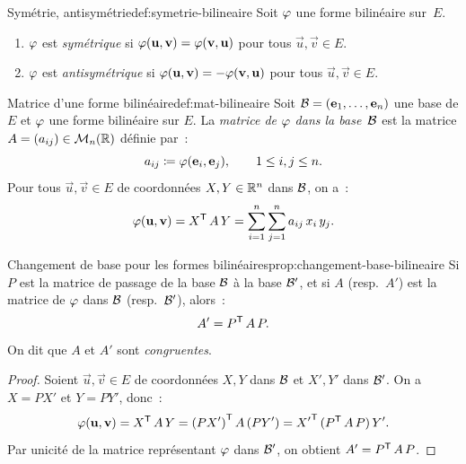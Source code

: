 \begin{definition}{Symétrie, antisymétrie}{def:symetrie-bilineaire}
  Soit $\varphi$ une forme bilinéaire sur~$E$.
  \begin{enumerate}[label=(\roman*)]
    \item $\varphi$ est \emph{symétrique} si
      $\varphi(\mathbf{u},\mathbf{v})=\varphi(\mathbf{v},\mathbf{u})$ pour tous
      $\vec{u},\vec{v}\in E$.
    \item $\varphi$ est \emph{antisymétrique} si
      $\varphi(\mathbf{u},\mathbf{v})=-\varphi(\mathbf{v},\mathbf{u})$ pour tous
      $\vec{u},\vec{v}\in E$.
  \end{enumerate}
\end{definition}

\begin{definition}{Matrice d'une forme bilinéaire}{def:mat-bilineaire}
  Soit ${\mathcal{B}}=(\mathbf{e}_{1},\ldots,\mathbf{e}_{n})$ une base de $E$ et $\varphi$ une
  forme bilinéaire sur $E$. La \emph{matrice de $\varphi$ dans la
  base~${\mathcal{B}}$} est la matrice $A=(a_{ij})\in\mathcal{M}_n({\mathbb{R}})$ définie par~:
  \[
    a_{ij}\coloneqq\varphi(\mathbf{e}_{i},\mathbf{e}_{j}),\qquad 1\leq i,j\leq n.
  \]
  Pour tous $\vec{u},\vec{v}\in E$ de coordonnées $X,Y\in{\mathbb{R}}^n$ dans
  ${\mathcal{B}}$, on a~:
  \[
    \varphi(\mathbf{u},\mathbf{v})={X}^{\mathsf{T}}\,A\,Y
    =\sum_{i=1}^n\sum_{j=1}^n a_{ij}\,x_i\,y_j.
  \]
\end{definition}

\begin{proposition}{Changement de base pour les formes bilinéaires}{prop:changement-base-bilineaire}
  Si $P$ est la matrice de passage de la base ${\mathcal{B}}$ à la base ${\mathcal{B}}'$,
  et si $A$ (resp.\ $A'$) est la matrice de $\varphi$ dans ${\mathcal{B}}$
  (resp.\ ${\mathcal{B}}'$), alors~:
  \[
    A'={P}^{\mathsf{T}}\,A\,P.
  \]
  On dit que $A$ et $A'$ sont \emph{congruentes}.
\end{proposition}

\begin{proof}
  Soient $\vec{u},\vec{v}\in E$ de coordonnées $X,Y$ dans ${\mathcal{B}}$ et
  $X',Y'$ dans ${\mathcal{B}}'$. On a $X=PX'$ et $Y=PY'$, donc~:
  \[
    \varphi(\mathbf{u},\mathbf{v})={X}^{\mathsf{T}}\,A\,Y
    ={(PX')}^{\mathsf{T}}\,A\,(PY')
    ={X'}^{\mathsf{T}}\,({P}^{\mathsf{T}}\,A\,P)\,Y'.
  \]
  Par unicité de la matrice représentant $\varphi$ dans ${\mathcal{B}}'$, on obtient
  $A'={P}^{\mathsf{T}}\,A\,P$.
\end{proof}

